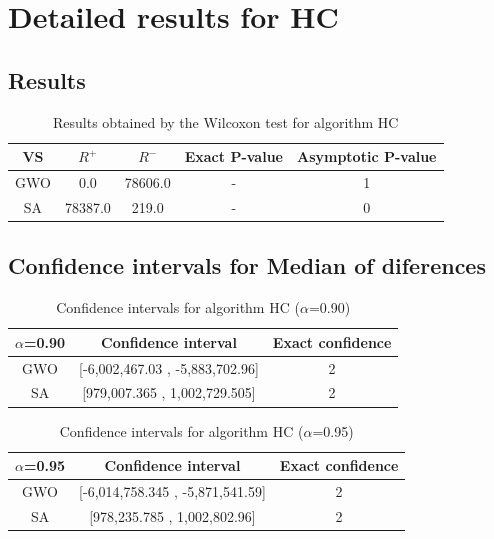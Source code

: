 \documentclass[a4paper,10pt]{article}
\begin{document}
 \clearpage 


\section{Detailed results for HC}


\subsection{Results}

\begin{table}[!htp]
\centering\small
\begin{tabular}{
|c|c|c|c|c|}
\hline
 VS & $R^{+}$ & $R^{-}$ & Exact P-value & Asymptotic P-value \\ \hline 
GWO & 0.0 & 78606.0 & - & 1\\ \hline 
SA & 78387.0 & 219.0 & - & 0\\ \hline 

\end{tabular}
\caption{Results obtained by the Wilcoxon test for algorithm HC}
\end{table}

\subsection{Confidence intervals for Median of diferences}

\begin{table}[!htp]
\centering\small
\begin{tabular}{
|c|c|c|}
\hline
 $\alpha$=0.90 & Confidence interval & Exact confidence \\ \hline 
GWO & [-6,002,467.03 , -5,883,702.96] & 2\\ \hline 
SA & [979,007.365 , 1,002,729.505] & 2\\ \hline 

\end{tabular}
\caption{Confidence intervals for algorithm HC ($\alpha$=0.90)}
\end{table}
\begin{table}[!htp]
\centering\small
\begin{tabular}{
|c|c|c|}
\hline
 $\alpha$=0.95 & Confidence interval & Exact confidence \\ \hline 
GWO & [-6,014,758.345 , -5,871,541.59] & 2\\ \hline 
SA & [978,235.785 , 1,002,802.96] & 2\\ \hline 

\end{tabular}
\caption{Confidence intervals for algorithm HC ($\alpha$=0.95)}
\end{table}

 \clearpage 
\end{document}
